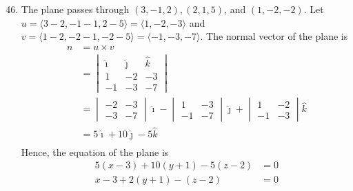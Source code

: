 \begin{enumerate}
    \setcounter{enumi}{45}
    \item The plane passes through $(3,-1,2),(2,1,5)$, and $(1,-2,-2)$. \sol{} Let $u =
              \langle 3 - 2, -1 - 1, 2 - 5 \rangle = \langle 1, -2, -3 \rangle$ and $v =
              \langle 1 - 2, -2 - 1, -2 - 5 \rangle = \langle -1, -3, -7 \rangle$. The normal
          vector of the plane is
          \begin{align*}
              n & = u \times v                                                                   \\
                & = \begin{vmatrix}
                        \hat{\imath} & \hat{\jmath} & \hat{k} \\
                        1            & -2           & -3      \\
                        -1           & -3           & -7
                    \end{vmatrix}                    \\
                & = \begin{vmatrix}
                        -2 & -3 \\
                        -3 & -7
                    \end{vmatrix}\hat{\imath} - \begin{vmatrix}
                                                    1  & -3 \\
                                                    -1 & -7
                                                \end{vmatrix}\hat{\jmath} + \begin{vmatrix}
                                                                                1  & -2 \\
                                                                                -1 & -3
                                                                            \end{vmatrix}\hat{k} \\
                & = 5\hat{\imath} + 10\hat{\jmath} - 5\hat{k}                                    \\
          \end{align*}
          Hence, the equation of the plane is
          \begin{align*}
              5(x - 3) + 10(y + 1) - 5(z - 2) & = 0 \\
              x - 3 + 2(y + 1) - (z - 2)      & = 0 \\

\end{align*}
\end{enumerate}
